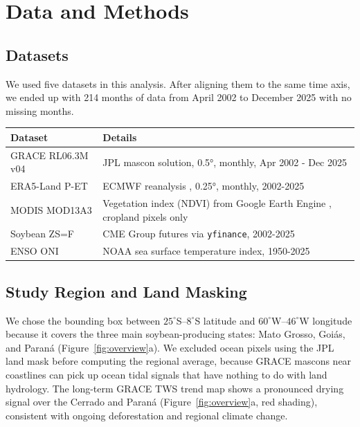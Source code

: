 \documentclass[6pt, twocolumn]{article}
\begin{document}
\columnbreak
\section{Data and Methods}
\label{sec:data}

\subsection{Datasets}

We used five datasets in this analysis. After aligning them to the
same time axis, we ended up with 214 months of data from
April 2002 to December 2025 with no missing months.

\begin{tabularx}{\columnwidth}{@{} l X @{}}
  \toprule
  \textbf{Dataset} & \textbf{Details} \\
  \midrule
  GRACE RL06.3M v04 & JPL mascon solution, 0.5°, monthly, Apr 2002 - Dec 2025 \\
  ERA5-Land P-ET  & ECMWF reanalysis \cite{hersbach2020era5}, 0.25°, monthly, 2002-2025 \\
  MODIS MOD13A3     & Vegetation index (NDVI) from Google Earth Engine \cite{gorelick2017gee, didan2021mod13a3}, cropland pixels only \\
  Soybean ZS=F      & CME Group futures via \texttt{yfinance}, 2002-2025 \\
  ENSO ONI          & NOAA sea surface temperature index, 1950-2025 \\
  \bottomrule
\end{tabularx}

\subsection{Study Region and Land Masking}

We chose the bounding box between $25^\circ$S--$8^\circ$S latitude
and $60^\circ$W--$46^\circ$W longitude because it covers the three
main soybean-producing states: Mato Grosso, Goiás, and Paraná
(Figure~\ref{fig:overview}a). We excluded ocean pixels using the JPL
land mask before computing the regional average, because GRACE
mascons near coastlines can pick up ocean tidal signals that have
nothing to do with land hydrology. The long-term GRACE TWS trend map
shows a pronounced drying signal over the Cerrado and Paraná
(Figure~\ref{fig:overview}a, red shading), consistent with ongoing
deforestation and regional climate change.
\end{document}
